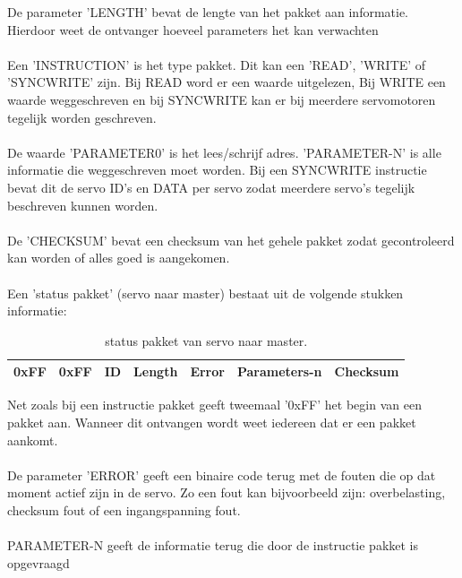 \documentclass[10pt,a4paper]{article}
\begin{document}
De parameter 'LENGTH' bevat de lengte van het pakket aan informatie. Hierdoor weet de ontvanger hoeveel parameters het kan verwachten\\\\
Een 'INSTRUCTION' is het type pakket. Dit kan een 'READ', 'WRITE' of 'SYNCWRITE' zijn. Bij READ word er een waarde uitgelezen, Bij WRITE een waarde weggeschreven en bij SYNCWRITE kan er bij meerdere servomotoren tegelijk worden geschreven.\\\\
De waarde 'PARAMETER0' is het lees/schrijf adres.
'PARAMETER-N' is alle informatie die weggeschreven moet worden. Bij een SYNCWRITE instructie bevat dit de servo ID's en DATA per servo zodat meerdere servo's tegelijk beschreven kunnen worden.\\\\
De 'CHECKSUM' bevat een checksum van het gehele pakket zodat gecontroleerd kan worden of alles goed is aangekomen.\\\\
Een 'status pakket' (servo naar master) bestaat uit de volgende stukken informatie:\\

\begin{table}[]
\centering
\caption{status pakket van servo naar master.}
\label{instructionpackage}
\begin{tabular}{|l|l|l|l|l|l|l|}
\hline
0xFF & 0xFF & ID & Length & Error & Parameters-n & Checksum \\ \hline
\end{tabular}
\end{table}

Net zoals bij een instructie pakket geeft tweemaal '0xFF' het begin van een pakket aan. Wanneer dit ontvangen wordt weet iedereen dat er een pakket aankomt.\\\\

De parameter 'ERROR' geeft een binaire code terug met de fouten die op dat moment actief zijn in de servo. Zo een fout kan bijvoorbeeld zijn: overbelasting, checksum fout of een ingangspanning fout.\\\\
PARAMETER-N geeft de informatie terug die door de instructie pakket is opgevraagd\\\\
\end{document}
